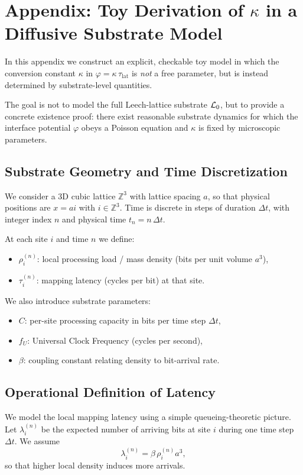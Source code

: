 
\section{Appendix: Toy Derivation of $\kappa$ in a Diffusive Substrate Model}
\label{app:kappa-toy}

In this appendix we construct an explicit, checkable toy model in which the
conversion constant $\kappa$ in $\varphi = \kappa \, \tau_{\mathrm{lat}}$
is \emph{not} a free parameter, but is instead determined by substrate-level
quantities.

The goal is not to model the full Leech-lattice substrate $\mathcal{L}_0$, but to
provide a concrete existence proof: there exist reasonable substrate dynamics
for which the interface potential $\varphi$ obeys a Poisson equation and
$\kappa$ is fixed by microscopic parameters.

\subsection{Substrate Geometry and Time Discretization}
We consider a 3D cubic lattice $\mathbb{Z}^3$ with lattice spacing $a$, so that
physical positions are $x = a i$ with $i \in \mathbb{Z}^3$. Time is discrete
in steps of duration $\Delta t$, with integer index $n$ and physical time
$t_n = n\,\Delta t$.

At each site $i$ and time $n$ we define:
\begin{itemize}
  \item $\rho_i^{(n)}$: local processing load / mass density (bits per unit volume $a^3$),
  \item $\tau_i^{(n)}$: mapping latency (cycles per bit) at that site.
\end{itemize}

We also introduce substrate parameters:
\begin{itemize}
  \item $C$: per-site processing capacity in bits per time step $\Delta t$,
  \item $f_U$: Universal Clock Frequency (cycles per second),
  \item $\beta$: coupling constant relating density to bit-arrival rate.
\end{itemize}

\subsection{Operational Definition of Latency}
We model the local mapping latency using a simple queueing-theoretic picture.
Let $\lambda_i^{(n)}$ be the expected number of arriving bits at site $i$
during one time step $\Delta t$. We assume
\begin{equation}
\lambda_i^{(n)} = \beta \, \rho_i^{(n)} a^3,
\end{equation}
so that higher local density induces more arrivals.

